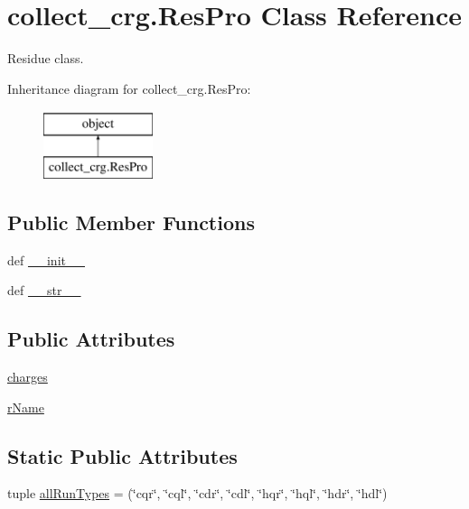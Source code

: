 \hypertarget{classcollect__crg_1_1_res_pro}{\section{collect\-\_\-crg.\-Res\-Pro Class Reference}
\label{classcollect__crg_1_1_res_pro}
}


Residue class.  


Inheritance diagram for collect\-\_\-crg.\-Res\-Pro\-:\begin{figure}[H]
\begin{center}
\leavevmode
\includegraphics[height=2.000000cm]{classcollect__crg_1_1_res_pro}
\end{center}
\end{figure}
\subsection*{Public Member Functions}
\begin{DoxyCompactItemize}
\item 
def \hyperlink{classcollect__crg_1_1_res_pro_ab563227610708f8c5867c766b3b7d3e9}{\-\_\-\-\_\-init\-\_\-\-\_\-}
\item 
def \hyperlink{classcollect__crg_1_1_res_pro_ac4141791c8bd45b3ffe8b5ec2483bfc1}{\-\_\-\-\_\-str\-\_\-\-\_\-}
\end{DoxyCompactItemize}
\subsection*{Public Attributes}
\begin{DoxyCompactItemize}
\item 
\hyperlink{classcollect__crg_1_1_res_pro_a7075290e45b0608bb59ebfe42722b4e3}{charges}
\item 
\hyperlink{classcollect__crg_1_1_res_pro_aec2b2fecfffa4aa7728013ee504d48f7}{r\-Name}
\end{DoxyCompactItemize}
\subsection*{Static Public Attributes}
\begin{DoxyCompactItemize}
\item 
tuple \hyperlink{classcollect__crg_1_1_res_pro_a0978c5440914518afa5bba719a40bfa1}{all\-Run\-Types} = (\char`\"{}cqr\char`\"{}, \char`\"{}cql\char`\"{}, \char`\"{}cdr\char`\"{}, \char`\"{}cdl\char`\"{}, \char`\"{}hqr\char`\"{}, \char`\"{}hql\char`\"{}, \char`\"{}hdr\char`\"{}, \char`\"{}hdl\char`\"{})
\end{DoxyCompactItemize}
